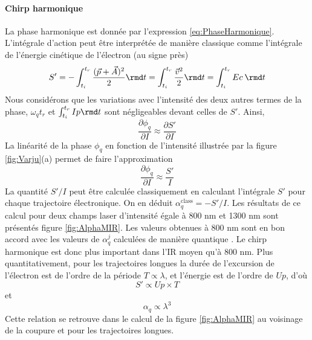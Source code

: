 \paragraph{Chirp harmonique} La phase harmonique est donnée par l'expression \ref{eq:PhaseHarmonique}. L'intégrale d'action peut être interprétée de manière classique comme l'intégrale de l'énergie cinétique de l'électron (au signe près) 
\begin{equation}
S' = - \int_{t_i}^{t_r} \frac{(\vec{p}+\vec{A})^2}{2} \rmd t = \int_{t_i}^{t_r} \frac{\vec{v}^2}{2} \rmd t = \int_{t_i}^{t_r} Ec \: \rmd t
\end{equation}
Nous considérons que les variations avec l'intensité des deux autres termes de la phase, $\omega_q t_r$ et $\int_{t_i}^{t_r} Ip \rmd t$ sont négligeables devant celles de $S'$. Ainsi, 
\begin{equation}
\frac{\partial \phi_q}{\partial I} \approx \frac{\partial S'}{\partial I}
\end{equation}
La linéarité de la phase $\phi_q$ en fonction de l'intensité illustrée par la figure \ref{fig:Varju}(a) permet de faire l'approximation
\begin{equation}
\frac{\partial \phi_q}{\partial I} \approx \frac{S'}{I}
\end{equation}
La quantité $S'/I$ peut être calculée classiquement en calculant l'intégrale $S'$ pour chaque trajectoire électronique. On en déduit $\alpha_q^{\text{class}} = - S'/I$. Les résultats de ce calcul pour deux champs laser d'intensité égale à 800 nm et 1300 nm sont présentés figure \ref{fig:AlphaMIR}. Les valeurs obtenues à 800 nm sont en bon accord avec les valeurs de $\alpha_q^j$ calculées de manière quantique . Le chirp harmonique est donc plus important dans l'IR moyen qu'à 800 nm. Plus quantitativement, pour les trajectoires longues la durée de l'excursion de l'électron est de l'ordre de la période $T \propto \lambda$, et l'énergie est de l'ordre de $Up$, d'où
\begin{equation}
S' \propto Up \times T
\end{equation}
et
\begin{equation}
\alpha_q \propto \lambda^3
\end{equation}
Cette relation se retrouve dans le calcul de la figure \ref{fig:AlphaMIR} au voisinage de la coupure et pour les trajectoires longues.


